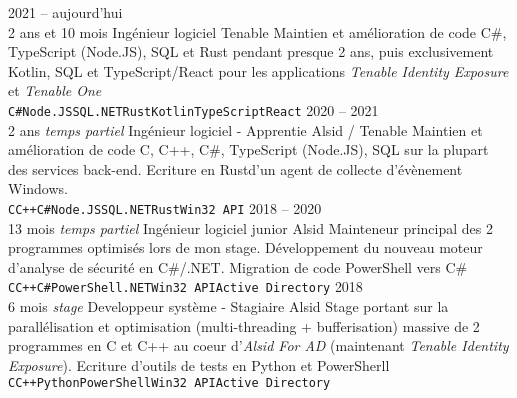 \documentclass[8pt]{developercv} %
\begin{document}
\begin{entrylist}
	\entry
		{2021 -- aujourd'hui\\\footnotesize{2 ans et 10 mois}}
		{Ingénieur logiciel}
		{Tenable}
		{
			Maintien et amélioration de code C\#, TypeScript (Node.JS), SQL et Rust pendant presque 2 ans, puis exclusivement Kotlin,
			SQL et TypeScript/React pour les applications \emph{Tenable Identity Exposure} et \emph{Tenable One}\\
			\texttt{C\#}\slashsep\texttt{Node.JS}\slashsep\texttt{SQL}\slashsep\texttt{.NET}\slashsep\texttt{Rust}\slashsep\texttt{Kotlin}\slashsep\texttt{TypeScript}\slashsep\texttt{React}
		}
	\entry
		{2020 -- 2021\\\footnotesize{2 ans \emph{temps partiel}}}
		{Ingénieur logiciel - Apprentie}
		{Alsid / Tenable}
		{
			Maintien et amélioration de code C, C++, C\#, TypeScript (Node.JS), SQL sur la plupart des services back-end. Ecriture en Rust\footnotemark[1] d'un agent de collecte d'évènement Windows.\\
			\texttt{C}\slashsep\texttt{C++}\slashsep\texttt{C\#}\slashsep\texttt{Node.JS}\slashsep\texttt{SQL}\slashsep\texttt{.NET}\slashsep\texttt{Rust}\slashsep\texttt{Win32 API}
		}
	\entry
		{2018 -- 2020\\\footnotesize{13 mois \emph{temps partiel}}}
		{Ingénieur logiciel junior}
		{Alsid}
		{
			Mainteneur principal des 2 programmes optimisés lors de mon stage. Développement du nouveau moteur d'analyse de sécurité en C\#/.NET. Migration de code PowerShell vers C\#\\
			\texttt{C}\slashsep\texttt{C++}\slashsep\texttt{C\#}\slashsep\texttt{PowerShell}\slashsep\texttt{.NET}\slashsep\texttt{Win32 API}\slashsep\texttt{Active Directory}
		}
	\entry
		{2018\\\footnotesize{6 mois \emph{stage}}}
		{Developpeur système  - Stagiaire}
		{Alsid}
		{
			Stage portant sur la parallélisation et optimisation (multi-threading + bufferisation) massive de 2 programmes en C et C++ au coeur d'\emph{Alsid For AD} (maintenant \emph{Tenable Identity Exposure}).
			Ecriture d'outils de tests en Python et PowerSherll\\
			\texttt{C}\slashsep\texttt{C++}\slashsep\texttt{Python}\slashsep\texttt{PowerShell}\slashsep\texttt{Win32 API}\slashsep\texttt{Active Directory}
		}
\end{entrylist}

\vfill %
\end{document}
